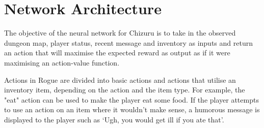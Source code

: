 \documentclass[11pt,a4paper]{article}
\begin{document}





\section{Network Architecture}
The objective of the neural network for Chizuru is to take in the observed dungeon map, player status, recent message and inventory as inputs and return an action that will maximise the expected reward as output as if it were maximising an action-value function.

Actions in Rogue are divided into basic actions and actions that utilise an inventory item, depending on the action and the item type. For example, the "eat" action can be used to make the player eat some food. If the player attempts to use an action on an item where it wouldn't make sense, a humorous message is displayed to the player such as `Ugh, you would get ill if you ate that'.
\end{document}
